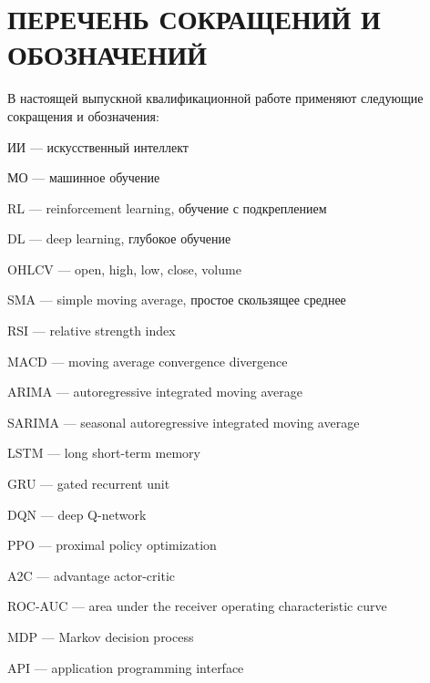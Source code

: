 \clearpage
\section*{ПЕРЕЧЕНЬ СОКРАЩЕНИЙ И ОБОЗНАЧЕНИЙ}

В настоящей выпускной квалификационной работе применяют следующие сокращения и обозначения:

ИИ — искусственный интеллект

МО — машинное обучение

RL — reinforcement learning, обучение с подкреплением

DL — deep learning, глубокое обучение

OHLCV — open, high, low, close, volume

SMA — simple moving average, простое скользящее среднее

RSI — relative strength index

MACD — moving average convergence divergence

ARIMA — autoregressive integrated moving average

SARIMA — seasonal autoregressive integrated moving average

LSTM — long short-term memory

GRU — gated recurrent unit

DQN — deep Q-network

PPO — proximal policy optimization

A2C — advantage actor-critic

ROC-AUC — area under the receiver operating characteristic curve

MDP — Markov decision process

API — application programming interface
